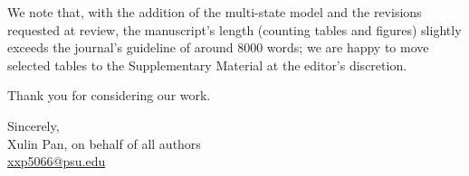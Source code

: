 \documentclass[11pt]{article}
\begin{document}
We note that, with the addition of the multi-state model and the revisions
requested at review, the manuscript's length (counting tables and figures)
slightly exceeds the journal's guideline of around 8000 words; we are happy to
move selected tables to the Supplementary Material at the editor's discretion.

\bigskip
\noindent Thank you for considering our work.

\bigskip
\noindent Sincerely,\\
Xulin Pan, on behalf of all authors\\
\href{mailto:xxp5066@psu.edu}{xxp5066@psu.edu}
\end{document}
